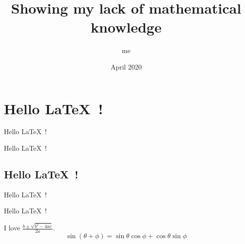 \documentclass[a4paper,12pt]{article}
\begin{document}
\title{Showing my lack of mathematical knowledge}
\author{me}
\date{April 2020}
\maketitle
\section{Hello \LaTeX\ !}

Hello \LaTeX\ !

Hello \LaTeX\ !

\subsection{Hello \LaTeX\ !}

Hello \LaTeX\ !

Hello \LaTeX\ !

I love $ \frac { b \pm \sqrt{ b^2 - 4ac } }{ 2a } $.
\[ \sin ( \theta + \phi ) = \sin \theta \cos \phi + \cos \theta \sin \phi \]
\end{document}
